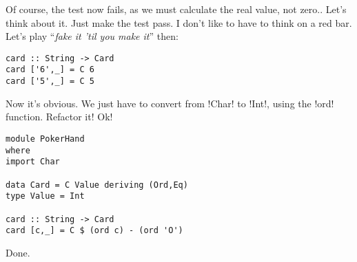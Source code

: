 \failure Of course, the test now fails, as we must calculate the real value, not zero.. Let's think about it.
\lhN \failure Just make the test pass. I don't like to have to think on a red bar.
\lhA \failure Let's play ``\emph{fake it 'til you make it}'' then:
\begin{lstlisting}[frame=single]
card :: String -> Card
card ['6',_] = C 6
card ['5',_] = C 5 
\end{lstlisting}
\success Now it's obvious.
\lhN \success We just have to convert from \il!Char! to \il!Int!, using the \il!ord! function. Refactor it!
\lhA \success Ok!
\begin{lstlisting}[frame=single]
module PokerHand
where
import Char

data Card = C Value deriving (Ord,Eq)
type Value = Int

card :: String -> Card
card [c,_] = C $ (ord c) - (ord 'O')
\end{lstlisting} %
\success Done.
\lhend